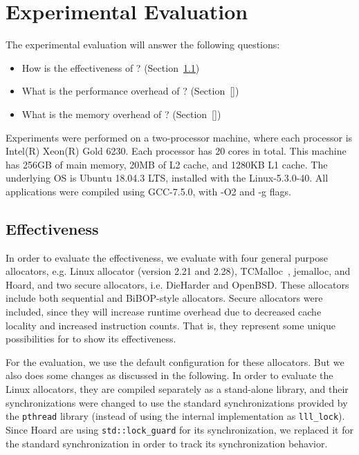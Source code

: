 \section{Experimental Evaluation}
\label{sec:evaluation}

The experimental evaluation will answer the following questions:
\begin{itemize}
\item How is the effectiveness of \MP{}? (Section~\ref{sec:effectiveness}) 	
\item What is the performance overhead of \MP{}? (Section~\ref{})
\item What is the memory overhead of \MP{}? (Section~\ref{})
\end{itemize}

Experiments were performed on a two-processor machine, where each processor is Intel(R) Xeon(R) Gold 6230. Each processor has 20 cores in total. This machine has 256GB of main memory, 20MB of L2 cache, and 1280KB L1 cache. The underlying OS is Ubuntu 18.04.3 LTS, installed with the Linux-5.3.0-40. All applications were compiled using GCC-7.5.0, with -O2 and -g flags.

\subsection{Effectiveness}
\label{sec:effectiveness}

In order to evaluate the effectiveness, we evaluate \MP{} with four general purpose allocators, e.g. Linux allocator (version 2.21 and 2.28), TCMalloc~\citep{tcmalloc}, jemalloc, and Hoard, and two secure allocators, i.e. DieHarder and OpenBSD. These allocators include both sequential and BiBOP-style allocators. Secure allocators were included, since they will increase runtime overhead due to decreased cache locality and increased instruction counts. That is, they represent some unique possibilities for \MP{} to show its effectiveness. 

For the evaluation, we use the default configuration for these allocators. But we also does some changes as discussed in the following. In order to evaluate the Linux allocators, they are compiled separately as a stand-alone library, and their synchronizations were changed to use the standard synchronizations provided by the \texttt{pthread} library (instead of using the internal implementation as \texttt{lll\_lock}). Since Hoard are using \texttt{std::lock\_guard} for its synchronization, we replaced it for the standard synchronization in order to track its synchronization behavior. 



